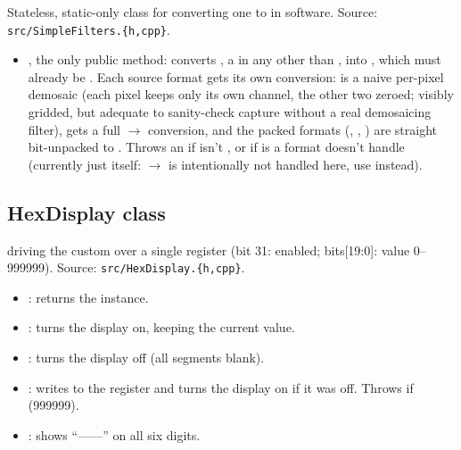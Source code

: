 Stateless, static-only class for converting one  to  in software. Source: \lstinline[style=inlineFsRepo]!src/SimpleFilters.{h,cpp}!.

\begin{itemize}
    \item {}, the only public method: converts , a  in any  other than , into , which must already be . Each source format gets its own conversion:  is a naive per-pixel demosaic (each pixel keeps only its own  channel, the other two zeroed; visibly gridded, but adequate to sanity-check capture without a real demosaicing filter),  gets a full $\rightarrow$ conversion, and the packed  formats (, , ) are straight bit-unpacked to . Throws an  if  isn't , or if  is a format  doesn't handle (currently just  itself: $\rightarrow$ is intentionally not handled here, use  instead).
\end{itemize}

\subsection{HexDisplay class}
\label{subsec:fpgasteel-hex-display}

 driving the custom   over a single  register (bit 31: enabled; bits[19:0]: value 0--999999). Source: \lstinline[style=inlineFsRepo]!src/HexDisplay.{h,cpp}!.

\begin{itemize}
    \item {}: returns the  instance.
    \item {}: turns the display on, keeping the current value.
    \item {}: turns the display off (all segments blank).
    \item {}: writes  to the register and turns the display on if it was off. Throws  if  (999999).
    \item {}: shows ``------'' on all six digits.
\end{itemize}

